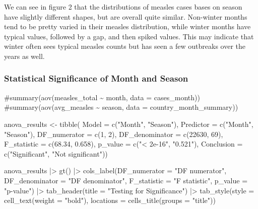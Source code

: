 \documentclass[
  letterpaper,
  DIV=11,
  numbers=noendperiod]{scrartcl}
\newenvironment{Shaded}{\begin{snugshade}}{\end{snugshade}}
\newcommand{\AttributeTok}[1]{\textcolor[rgb]{0.40,0.45,0.13}{#1}}
\newcommand{\CommentTok}[1]{\textcolor[rgb]{0.37,0.37,0.37}{#1}}
\newcommand{\DecValTok}[1]{\textcolor[rgb]{0.68,0.00,0.00}{#1}}
\newcommand{\FloatTok}[1]{\textcolor[rgb]{0.68,0.00,0.00}{#1}}
\newcommand{\FunctionTok}[1]{\textcolor[rgb]{0.28,0.35,0.67}{#1}}
\newcommand{\NormalTok}[1]{\textcolor[rgb]{0.00,0.23,0.31}{#1}}
\newcommand{\OtherTok}[1]{\textcolor[rgb]{0.00,0.23,0.31}{#1}}
\newcommand{\SpecialCharTok}[1]{\textcolor[rgb]{0.37,0.37,0.37}{#1}}
\newcommand{\StringTok}[1]{\textcolor[rgb]{0.13,0.47,0.30}{#1}}
\begin{document}
We can see in figure 2 that the distributions of measles cases bases on
season have slightly different shapes, but are overall quite similar.
Non-winter months tend to be pretty varied in their measles
distribution, while winter months have typical values, followed by a
gap, and then spiked values. This may indicate that winter often sees
typical measles counts but has seen a few outbreaks over the years as
well.

\subsubsection{Statistical Significance of Month and
Season}\label{statistical-significance-of-month-and-season}

\begin{Shaded}
\begin{Highlighting}[]
\CommentTok{\#summary(aov(measles\_total \textasciitilde{} month, data = cases\_month))}
\CommentTok{\#summary(aov(avg\_measles \textasciitilde{} season, data = country\_month\_summary))}

\NormalTok{anova\_results }\OtherTok{\textless{}{-}} \FunctionTok{tibble}\NormalTok{(}
  \AttributeTok{Model =} \FunctionTok{c}\NormalTok{(}\StringTok{"Month"}\NormalTok{, }\StringTok{"Season"}\NormalTok{),}
  \AttributeTok{Predictor =} \FunctionTok{c}\NormalTok{(}\StringTok{"Month"}\NormalTok{, }\StringTok{"Season"}\NormalTok{),}
  \AttributeTok{DF\_numerator =} \FunctionTok{c}\NormalTok{(}\DecValTok{1}\NormalTok{, }\DecValTok{2}\NormalTok{),}
  \AttributeTok{DF\_denominator =} \FunctionTok{c}\NormalTok{(}\DecValTok{22630}\NormalTok{, }\DecValTok{69}\NormalTok{),}
  \AttributeTok{F\_statistic =} \FunctionTok{c}\NormalTok{(}\FloatTok{68.34}\NormalTok{, }\FloatTok{0.658}\NormalTok{),}
  \AttributeTok{p\_value =} \FunctionTok{c}\NormalTok{(}\StringTok{"\textless{} 2e{-}16"}\NormalTok{, }\StringTok{"0.521"}\NormalTok{),}
  \AttributeTok{Conclusion =} \FunctionTok{c}\NormalTok{(}\StringTok{"Significant"}\NormalTok{, }\StringTok{"Not significant"}\NormalTok{))}

\NormalTok{anova\_results }\SpecialCharTok{|\textgreater{}}
  \FunctionTok{gt}\NormalTok{() }\SpecialCharTok{|\textgreater{}}
  \FunctionTok{cols\_label}\NormalTok{(}\AttributeTok{DF\_numerator =} \StringTok{"DF numerator"}\NormalTok{,}
             \AttributeTok{DF\_denominator =} \StringTok{"DF denominator"}\NormalTok{,}
             \AttributeTok{F\_statistic =} \StringTok{"F statistic"}\NormalTok{,}
             \AttributeTok{p\_value =} \StringTok{"p{-}value"}\NormalTok{) }\SpecialCharTok{|\textgreater{}}
  \FunctionTok{tab\_header}\NormalTok{(}\AttributeTok{title =} \StringTok{"Testing for Significance"}\NormalTok{) }\SpecialCharTok{|\textgreater{}}
  \FunctionTok{tab\_style}\NormalTok{(}\AttributeTok{style =} \FunctionTok{cell\_text}\NormalTok{(}\AttributeTok{weight =} \StringTok{"bold"}\NormalTok{),}
            \AttributeTok{locations =} \FunctionTok{cells\_title}\NormalTok{(}\AttributeTok{groups =} \StringTok{"title"}\NormalTok{))}
\end{Highlighting}
\end{Shaded}
\end{document}
